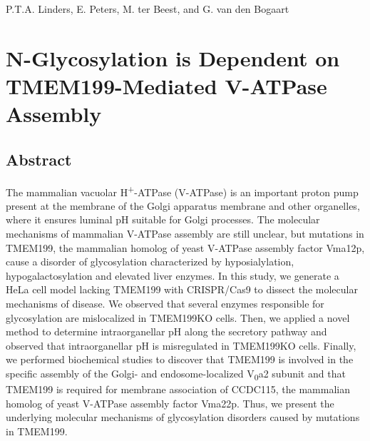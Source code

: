 
\stopthumb




\thispagestyle{empty}
\begin{savequote}
    \normalfont\normalsize{P.T.A. Linders, E. Peters, M. ter Beest, and G. van den Bogaart\\}
\end{savequote}
\chapter{N-Glycosylation is Dependent on TMEM199-Mediated V-ATPase Assembly}

\thispagestyle{empty}

\clearpage

\continuethumb
\section{Abstract}

The mammalian vacuolar H\textsuperscript{+}-ATPase (V-ATPase) is an important proton pump present at the membrane of the Golgi apparatus membrane and other organelles, where it ensures luminal pH suitable for Golgi processes. The molecular mechanisms of mammalian V-ATPase assembly are still unclear, but mutations in TMEM199, the mammalian homolog of yeast V-ATPase assembly factor Vma12p, cause a disorder of glycosylation characterized by hyposialylation, hypogalactosylation and elevated liver enzymes. In this study, we generate a HeLa cell model lacking TMEM199 with CRISPR/Cas9 to dissect the molecular mechanisms of disease. We observed that several enzymes responsible for glycosylation are mislocalized in TMEM199KO cells. Then, we applied a novel method to determine intraorganellar pH along the secretory pathway and observed that intraorganellar pH is misregulated in TMEM199KO cells. Finally, we performed biochemical studies to discover that TMEM199 is involved in the specific assembly of the Golgi- and endosome-localized V\textsubscript{0}a2 subunit and that TMEM199 is required for membrane association of CCDC115, the mammalian homolog of yeast V-ATPase assembly factor Vma22p. Thus, we present the underlying molecular mechanisms of glycosylation disorders caused by mutations in TMEM199.

